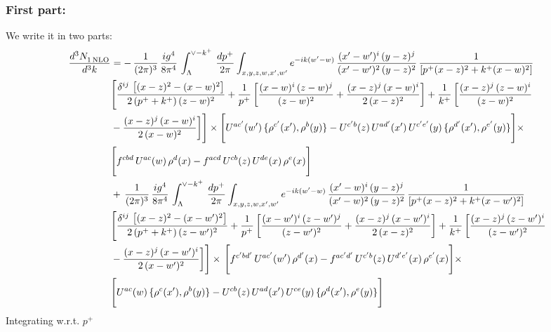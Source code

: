 \documentclass[9pt]{article}
\numberwithin{equation}{section}
\begin{document}
\subsubsection{First part:\,}
We write it in two parts: 
\begin{align}
    \frac{d^{3}N_{1\,\rm NLO}^{\rm}}{d^{3}k}  & = -\,\frac{1}{(2\pi)^{3}}\, \frac{ig^{4}}{8\pi^{4}}\, \int_{\Lambda}^{\vee-k^{+}}\, \frac{dp^{+}}{2\pi}\int_{x,y,z,w,x',w^{\prime}} e^{-ik(w^{\prime}-w)}\, \frac{(x'-w')^{i}\,(y-z)^{j}}{(x'-w')^{2}\,(y-z)^{2}}\,\frac{1}{\left[p^{+}(x-z)^{2}+k^{+}(x-w)^{2}\right]} \notag \\ & \Bigg[\frac{\delta^{ij}\, \left[(x-z)^{2}-(x-w)^{2}\right]}{2\, (p^{+}+k^{+})\,(z-w)^{2}}+\frac{1}{p^{+}}\, \bigg[\frac{(x-w)^{i}\,(z-w)^{j}}{(z-w)^{2}}+\frac{(x-z)^{j}\,(x-w)^{i}}{2\,(x-z)^{2}}\bigg]+\frac{1}{k^{+}}\,\bigg[\frac{(x-z)^{j}\,(z-w)^{i}}{(z-w)^{2}}\notag \\ & -\frac{(x-z)^{j}\,(x-w)^{i}}{2\,(x-w)^{2}}\bigg]\Bigg]\times \Bigg[U^{ac'}(w')\,\{\rho^{c'}(x'),\rho^{b}(y)\}-U^{c'b}(z)\,U^{ad'}(x')\,U^{c'e'}(y)\, \{\rho^{d'}(x'),\rho^{e'}(y)\}\Bigg]\times \notag \\ & \Bigg[f^{cbd}\,U^{ac}(w)\,\rho^{d}(x)-f^{acd}\, U^{cb}(z)\,U^{de}(x)\,\rho^{e}(x)\Bigg]\notag \\ & +\,\frac{1}{(2\pi)^{3}}\, \frac{ig^{4}}{8\pi^{4}}\, \int_{\Lambda}^{\vee-k^{+}}\,\frac{dp^{+}}{2\pi}\int_{x,y,z,w,x',w^{\prime}} e^{-ik(w^{\prime}-w)}\, \frac{(x'-w)^{i}\,(y-z)^{j}}{(x'-w)^{2}\,(y-z)^{2}}\,\frac{1}{\left[p^{+}(x-z)^{2}+k^{+}(x-w')^{2}\right]} \notag \\ & \Bigg[\frac{\delta^{ij}\, \left[(x-z)^{2}-(x-w')^{2}\right]}{2\, (p^{+}+k^{+})\,(z-w')^{2}}+\frac{1}{p^{+}}\, \bigg[\frac{(x-w')^{i}\,(z-w')^{j}}{(z-w')^{2}}+\frac{(x-z)^{j}\,(x-w')^{i}}{2\,(x-z)^{2}}\bigg]+\frac{1}{k^{+}}\,\bigg[\frac{(x-z)^{j}\,(z-w')^{i}}{(z-w')^{2}}\notag \\ & -\frac{(x-z)^{j}\,(x-w')^{i}}{2\,(x-w')^{2}}\bigg]\Bigg]\times\,\Bigg[f^{c'bd'}\,U^{ac'}(w')\,\rho^{d'}(x)-f^{ac'd'}\, U^{c'b}(z)\,U^{d'e'}(x)\,\rho^{e'}(x)\Bigg] \times \notag \\ & \Bigg[U^{ac}(w)\,\{\rho^{c}(x'),\rho^{b}(y)\}-U^{cb}(z)\,U^{ad}(x')\,U^{ce}(y)\, \{\rho^{d}(x'),\rho^{e}(y)\}\Bigg]
\end{align}
Integrating w.r.t. $p^{+}$ 
\end{document}
